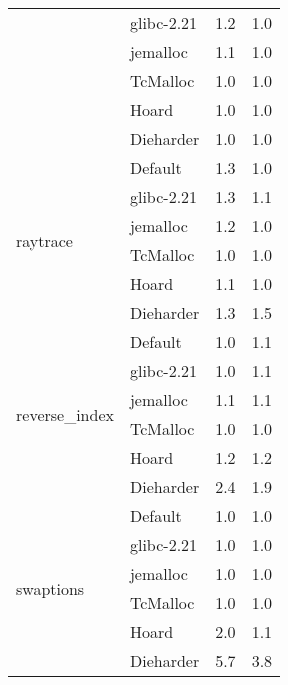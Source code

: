 \begin{table}[]
\begin{tabular}{|l|l|l|l|}
                                & glibc-2.21 & 1.2  & 1.0        \\ \cline{2-4} 
                                & jemalloc   & 1.1  & 1.0        \\ \cline{2-4} 
                                & TcMalloc   & 1.0  & 1.0        \\ \cline{2-4} 
                                & Hoard      & 1.0  & 1.0        \\ \cline{2-4} 
                                & Dieharder  & 1.0  & 1.0        \\ \hline
\multirow{6}{*}{raytrace}       & Default    & 1.3  & 1.0        \\ \cline{2-4} 
                                & glibc-2.21 & 1.3  & 1.1        \\ \cline{2-4} 
                                & jemalloc   & 1.2  & 1.0        \\ \cline{2-4} 
                                & TcMalloc   & 1.0  & 1.0        \\ \cline{2-4} 
                                & Hoard      & 1.1  & 1.0        \\ \cline{2-4} 
                                & Dieharder  & 1.3  & 1.5        \\ \hline
\multirow{6}{*}{reverse\_index} & Default    & 1.0  & 1.1        \\ \cline{2-4} 
                                & glibc-2.21 & 1.0  & 1.1        \\ \cline{2-4} 
                                & jemalloc   & 1.1  & 1.1        \\ \cline{2-4} 
                                & TcMalloc   & 1.0  & 1.0        \\ \cline{2-4} 
                                & Hoard      & 1.2  & 1.2        \\ \cline{2-4} 
                                & Dieharder  & 2.4  & 1.9        \\ \hline
\multirow{6}{*}{swaptions}      & Default    & 1.0  & 1.0        \\ \cline{2-4} 
                                & glibc-2.21 & 1.0  & 1.0        \\ \cline{2-4} 
                                & jemalloc   & 1.0  & 1.0        \\ \cline{2-4} 
                                & TcMalloc   & 1.0  & 1.0        \\ \cline{2-4} 
                                & Hoard      & 2.0  & 1.1        \\ \cline{2-4} 
                                & Dieharder  & 5.7  & 3.8        \\ \hline
\end{tabular}
\end{table}


